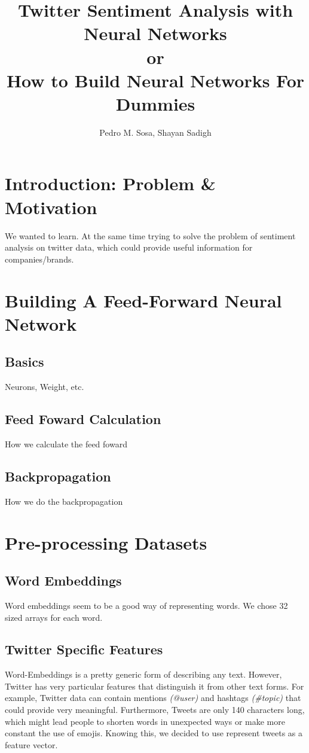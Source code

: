 \documentclass[11pt,onecolumn]{article} %
\title{Twitter Sentiment Analysis with Neural Networks\\or\\ How to Build Neural Networks For Dummies}
\author{Pedro M. Sosa, Shayan Sadigh}
\begin{document}
\maketitle

\begin{abstract}

\end{abstract}

\section{Introduction: Problem \& Motivation}
We wanted to learn. At the same time trying to solve the problem of sentiment analysis on twitter data, which could provide useful information for companies/brands.


\section{Building A Feed-Forward Neural Network}
\subsection{Basics}
Neurons, Weight, etc.
\subsection{Feed Foward Calculation}
How we calculate the feed foward
\subsection{Backpropagation}
How we do the backpropagation

\section{Pre-processing Datasets}
\subsection{Word Embeddings}
Word embeddings seem to be a good way of representing words. We chose 32 sized arrays for each word. 

\subsection{Twitter Specific Features}
Word-Embeddings is a pretty generic form of describing any text. However, Twitter has very particular features that distinguish it from other text forms. For example, Twitter data can contain mentions \textit{(@user)} and hashtags \textit{(\#topic)} that could provide very meaningful. Furthermore, Tweets are only 140 characters long, which might lead people to shorten words in unexpected ways or make more constant the use of emojis. Knowing this, we decided to use represent tweets as a feature vector.
\end{document}
